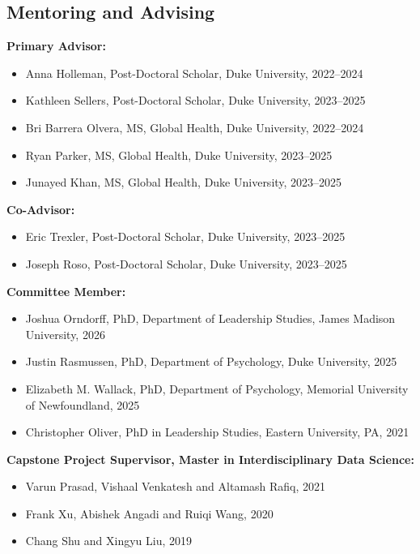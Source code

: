 \subsection*{Mentoring and Advising}
\textbf{Primary Advisor:}
\begin{itemize}
	\item Anna Holleman, Post-Doctoral Scholar, Duke University, 2022--2024
	\item Kathleen Sellers, Post-Doctoral Scholar, Duke University, 2023--2025
	\item Bri Barrera Olvera, MS, Global Health, Duke University, 2022--2024
	\item Ryan Parker, MS, Global Health, Duke University, 2023--2025
	\item Junayed Khan, MS, Global Health, Duke University, 2023--2025
\end{itemize}
\textbf{Co-Advisor:}
\begin{itemize}
	\item Eric Trexler, Post-Doctoral Scholar, Duke University, 2023--2025
	\item Joseph Roso, Post-Doctoral Scholar, Duke University, 2023--2025
\end{itemize}
\textbf{Committee Member:}
\begin{itemize}
	\item Joshua Orndorff, PhD, Department of Leadership Studies, James Madison University, 2026
	\item Justin Rasmussen, PhD, Department of Psychology, Duke University, 2025
	\item Elizabeth M. Wallack, PhD, Department of Psychology, Memorial University of Newfoundland, 2025
	\item Christopher Oliver, PhD in Leadership Studies, Eastern University, PA, 2021
\end{itemize}
\textbf{Capstone Project Supervisor, Master in Interdisciplinary Data Science:}
\begin{itemize}
	\item Varun Prasad, Vishaal Venkatesh and Altamash Rafiq, 2021
	\item Frank Xu, Abishek Angadi and Ruiqi Wang, 2020
	\item Chang Shu and Xingyu Liu, 2019
\end{itemize}